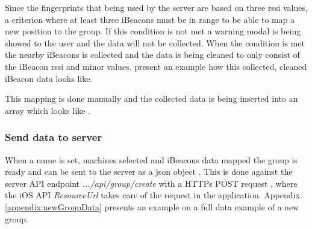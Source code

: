 \bigskip

Since the fingerprints that being used by the server are based on three \acrshort{rssi} values, a criterion where at least three iBeacons must be in range to be able to map a new position to the group.
If this condition is not met a warning modal is being showed to the user and the data will not be collected.
When the condition is met the nearby iBeacons is collected and the data is being cleaned to only consist of the iBeacon \acrshort{rssi} and minor values.
 present an example how this collected, cleaned iBeacon data looks like.


This mapping is done manually and the collected data is being inserted into an array which looks like .


\subsubsection{Send data to server}\label{sec:implAppnewGroupSend}
When a name is set, machines selected and iBeacons data mapped the group is ready and can be sent to the server as a \acrfull{json} object \cite{IntroducingJSON}.
This is done against the server API endpoint \textit{.../api/group/create} with a HTTPs POST request \cite{POSTHTTPMDN}, where the iOS API \textit{ResourceUrl} \cite{ResourceURLAppleDeveloper} takes care of the request in the application.
Appendix \ref{appendix:newGroupData} presents an example on a full data example of a new group.
